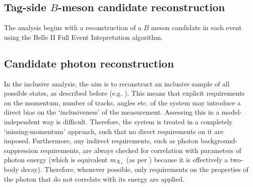 \subsection{Tag-side $B$-meson candidate reconstruction}

The analysis begins with a reconstruction of a $B$ meson candidate in each event using the Belle II Full Event Intepretation algorithm.


\subsection{Candidate photon reconstruction}

In the inclusive \BtoXsgamma analysis, the aim is to reconstruct an inclusive sample of all possible \Xs states, 
as described before (e.g. ).
This means that explicit requirements on the momentum, number of tracks, angles etc. of the \Xs system may introduce a direct bias on the `inclusiveness' of the measurement.
Assessing this in a model-independent way is difficult.
Therefore, the \Xs system is treated in a completely `missing-momentum' approach, such that no direct requirements on it are imposed.
Furthermore, any indirect requirements, such as photon background-suppression requirements, are always checked for correlation with parameters of photon energy (which is equivalent $m_{{X_s}}$ (as per ) because it is effectively a two-body decay).
Therefore, whenever possible, only requirements on the properties of the photon that do not correlate with its energy are applied.

